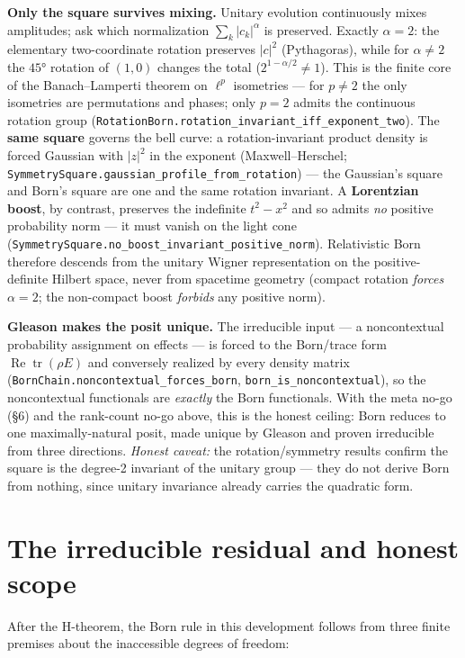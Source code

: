 \documentclass[11pt,a4paper]{article}
\begin{document}
\textbf{Only the square survives mixing.} Unitary evolution continuously mixes amplitudes; ask which normalization
$\sum_k|c_k|^\alpha$ is preserved. Exactly $\alpha=2$: the elementary two-coordinate rotation preserves
$|c|^2$ (Pythagoras), while for $\alpha\ne2$ the $45°$ rotation of $(1,0)$ changes the total
($2^{1-\alpha/2}\ne1$). This is the finite core of the Banach–Lamperti theorem on $\ell^p$ isometries — for
$p\ne2$ the only isometries are permutations and phases; only $p=2$ admits the continuous rotation group
(\texttt{RotationBorn.rotation\_invariant\_iff\_exponent\_two}). The \textbf{same square} governs the bell curve: a
rotation-invariant product density is forced Gaussian with $|z|^2$ in the exponent (Maxwell–Herschel;
\texttt{SymmetrySquare.gaussian\_profile\_from\_rotation}) — the Gaussian's square and Born's square are one and the
same rotation invariant. A \textbf{Lorentzian boost}, by contrast, preserves the indefinite $t^2-x^2$ and so admits
\emph{no} positive probability norm — it must vanish on the light cone (\texttt{SymmetrySquare.no\_boost\_invariant\_positive\_norm}).
Relativistic Born therefore descends from the unitary Wigner representation on the positive-definite Hilbert
space, never from spacetime geometry (compact rotation \emph{forces} $\alpha=2$; the non-compact boost \emph{forbids}
any positive norm).

\textbf{Gleason makes the posit unique.} The irreducible input — a noncontextual probability assignment on effects
— is forced to the Born/trace form $\operatorname{Re}\operatorname{tr}(\rho E)$ and conversely realized by
every density matrix (\texttt{BornChain.noncontextual\_forces\_born}, \texttt{born\_is\_noncontextual}), so the noncontextual
functionals are \emph{exactly} the Born functionals. With the meta no-go (§6) and the rank-count no-go above, this
is the honest ceiling: Born reduces to one maximally-natural posit, made unique by Gleason and proven
irreducible from three directions. \emph{Honest caveat:} the rotation/symmetry results confirm the square is the
degree-2 invariant of the unitary group — they do not derive Born from nothing, since unitary invariance
already carries the quadratic form.

\section{The irreducible residual and honest scope}

After the H-theorem, the Born rule in this development follows from three finite premises about the
inaccessible degrees of freedom:
\end{document}
